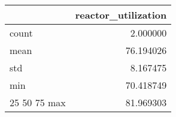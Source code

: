 \begin{tabular}{lr}
\toprule
 & reactor\_utilization \\
\midrule
count & 2.000000 \\
mean & 76.194026 \\
std & 8.167475 \\
min & 70.418749 \\
25%
50%
75%
max & 81.969303 \\
\bottomrule
\end{tabular}

